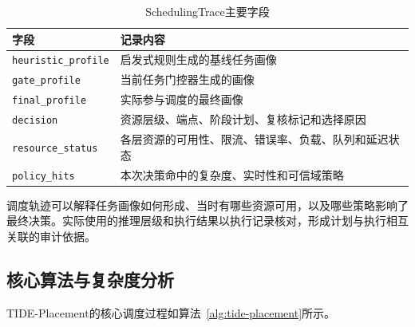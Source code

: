 \begin{table}[htbp]
    \centering
    \caption{SchedulingTrace主要字段}
    \label{tab:scheduling-trace}
    \begin{tabularx}{\textwidth}{p{}X}
        \toprule
        字段 & 记录内容 \\
        \midrule
        \texttt{heuristic\_profile}
        & 启发式规则生成的基线任务画像 \\

        \texttt{gate\_profile}
        & 当前任务门控器生成的画像 \\

        \texttt{final\_profile}
        & 实际参与调度的最终画像 \\

        \texttt{decision}
        & 资源层级、端点、阶段计划、复核标记和选择原因 \\

        \texttt{resource\_status}
        & 各层资源的可用性、限流、错误率、负载、队列和延迟状态 \\

        \texttt{policy\_hits}
        & 本次决策命中的复杂度、实时性和可信域策略 \\
        \bottomrule
    \end{tabularx}
\end{table}

调度轨迹可以解释任务画像如何形成、当时有哪些资源可用，以及哪些策略影响了最终决策。实际使用的推理层级和执行结果以执行记录核对，形成计划与执行相互关联的审计依据。




\subsection{核心算法与复杂度分析}

TIDE-Placement的核心调度过程如算法~\ref{alg:tide-placement}所示。

